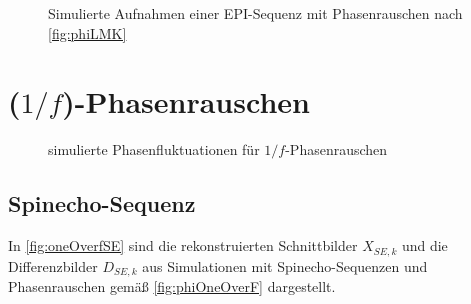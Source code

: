\begin{figure}[H]
	\hfill
	\hfill
	\caption[LMK04821 Phasenrauschen (EPI-Sequenz)]{Simulierte Aufnahmen einer EPI-Sequenz mit Phasenrauschen nach \autoref{fig:phiLMK}}
	\label{fig:lmkEPI}	
\end{figure}









\clearpage
\section{($1/f$)-Phasenrauschen}

\begin{figure}[H]
	\centering
	\caption[simulierte Phasenfluktuationen für $1/f$-Phasenrauschen]{simulierte Phasenfluktuationen für $1/f$-Phasenrauschen}
	\label{fig:phiOneOverF}
\end{figure}


\subsection{Spinecho-Sequenz}
In \autoref{fig:oneOverfSE} sind die rekonstruierten Schnittbilder $X_{SE,k}$ und die Differenzbilder $D_{SE,k}$ aus Simulationen mit Spinecho-Sequenzen und Phasenrauschen gemäß \autoref{fig:phiOneOverF} dargestellt.

